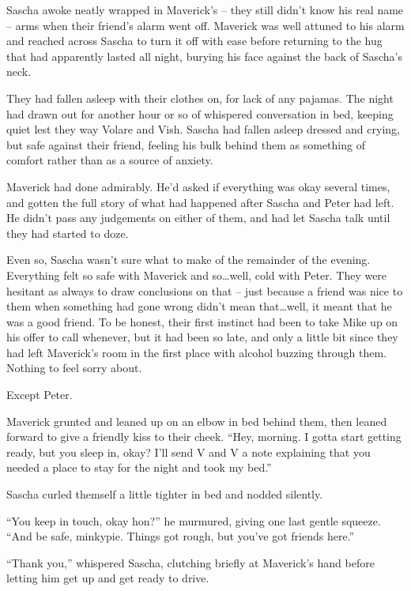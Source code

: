\secdiv{}

Sascha awoke neatly wrapped in Maverick's -- they still didn't know his real name -- arms when their friend's alarm went off. Maverick was well attuned to his alarm and reached across Sascha to turn it off with ease before returning to the hug that had apparently lasted all night, burying his face against the back of Sascha's neck.

They had fallen asleep with their clothes on, for lack of any pajamas. The night had drawn out for another hour or so of whispered conversation in bed, keeping quiet lest they way Volare and Vish. Sascha had fallen asleep dressed and crying, but safe against their friend, feeling his bulk behind them as something of comfort rather than as a source of anxiety.

Maverick had done admirably. He'd asked if everything was okay several times, and gotten the full story of what had happened after Sascha and Peter had left. He didn't pass any judgements on either of them, and had let Sascha talk until they had started to doze.

Even so, Sascha wasn't sure what to make of the remainder of the evening. Everything felt so safe with Maverick and so\ldots{}well, cold with Peter. They were hesitant as always to draw conclusions on that -- just because a friend was nice to them when something had gone wrong didn't mean that\ldots{}well, it meant that he was a good friend. To be honest, their first instinct had been to take Mike up on his offer to call whenever, but it had been so late, and only a little bit since they had left Maverick's room in the first place with alcohol buzzing through them. Nothing to feel sorry about.

Except Peter.

Maverick grunted and leaned up on an elbow in bed behind them, then leaned forward to give a friendly kiss to their cheek. ``Hey, morning. I gotta start getting ready, but you sleep in, okay? I'll send V and V a note explaining that you needed a place to stay for the night and took my bed.''

Sascha curled themself a little tighter in bed and nodded silently.

``You keep in touch, okay hon?'' he murmured, giving one last gentle squeeze. ``And be safe, minkypie. Things got rough, but you've got friends here.''

``Thank you,'' whispered Sascha, clutching briefly at Maverick's hand before letting him get up and get ready to drive.

